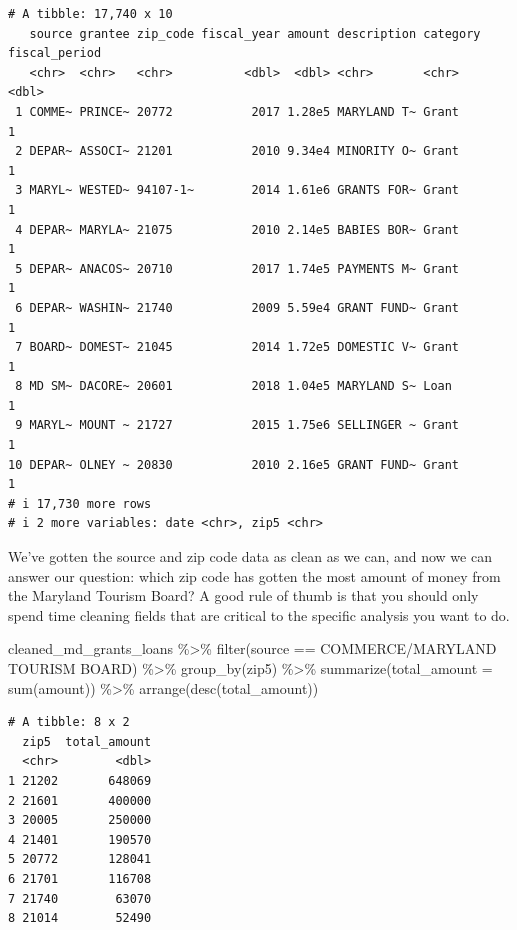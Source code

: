 \documentclass[
  letterpaper,
  DIV=11,
  numbers=noendperiod]{scrreprt}
\newenvironment{Shaded}{\begin{snugshade}}{\end{snugshade}}
\newcommand{\AttributeTok}[1]{\textcolor[rgb]{0.40,0.45,0.13}{#1}}
\newcommand{\FunctionTok}[1]{\textcolor[rgb]{0.28,0.35,0.67}{#1}}
\newcommand{\NormalTok}[1]{\textcolor[rgb]{0.00,0.23,0.31}{#1}}
\newcommand{\SpecialCharTok}[1]{\textcolor[rgb]{0.37,0.37,0.37}{#1}}
\newcommand{\StringTok}[1]{\textcolor[rgb]{0.13,0.47,0.30}{#1}}
\begin{document}
\begin{verbatim}
# A tibble: 17,740 x 10
   source grantee zip_code fiscal_year amount description category fiscal_period
   <chr>  <chr>   <chr>          <dbl>  <dbl> <chr>       <chr>            <dbl>
 1 COMME~ PRINCE~ 20772           2017 1.28e5 MARYLAND T~ Grant                1
 2 DEPAR~ ASSOCI~ 21201           2010 9.34e4 MINORITY O~ Grant                1
 3 MARYL~ WESTED~ 94107-1~        2014 1.61e6 GRANTS FOR~ Grant                1
 4 DEPAR~ MARYLA~ 21075           2010 2.14e5 BABIES BOR~ Grant                1
 5 DEPAR~ ANACOS~ 20710           2017 1.74e5 PAYMENTS M~ Grant                1
 6 DEPAR~ WASHIN~ 21740           2009 5.59e4 GRANT FUND~ Grant                1
 7 BOARD~ DOMEST~ 21045           2014 1.72e5 DOMESTIC V~ Grant                1
 8 MD SM~ DACORE~ 20601           2018 1.04e5 MARYLAND S~ Loan                 1
 9 MARYL~ MOUNT ~ 21727           2015 1.75e6 SELLINGER ~ Grant                1
10 DEPAR~ OLNEY ~ 20830           2010 2.16e5 GRANT FUND~ Grant                1
# i 17,730 more rows
# i 2 more variables: date <chr>, zip5 <chr>
\end{verbatim}

We've gotten the source and zip code data as clean as we can, and now we
can answer our question: which zip code has gotten the most amount of
money from the Maryland Tourism Board? A good rule of thumb is that you
should only spend time cleaning fields that are critical to the specific
analysis you want to do.

\begin{Shaded}
\begin{Highlighting}[]
\NormalTok{cleaned\_md\_grants\_loans }\SpecialCharTok{\%\textgreater{}\%} 
  \FunctionTok{filter}\NormalTok{(source }\SpecialCharTok{==} \StringTok{\textquotesingle{}COMMERCE/MARYLAND TOURISM BOARD\textquotesingle{}}\NormalTok{) }\SpecialCharTok{\%\textgreater{}\%} 
  \FunctionTok{group\_by}\NormalTok{(zip5) }\SpecialCharTok{\%\textgreater{}\%} 
  \FunctionTok{summarize}\NormalTok{(}\AttributeTok{total\_amount =} \FunctionTok{sum}\NormalTok{(amount)) }\SpecialCharTok{\%\textgreater{}\%} 
  \FunctionTok{arrange}\NormalTok{(}\FunctionTok{desc}\NormalTok{(total\_amount))}
\end{Highlighting}
\end{Shaded}

\begin{verbatim}
# A tibble: 8 x 2
  zip5  total_amount
  <chr>        <dbl>
1 21202       648069
2 21601       400000
3 20005       250000
4 21401       190570
5 20772       128041
6 21701       116708
7 21740        63070
8 21014        52490
\end{verbatim}
\end{document}

